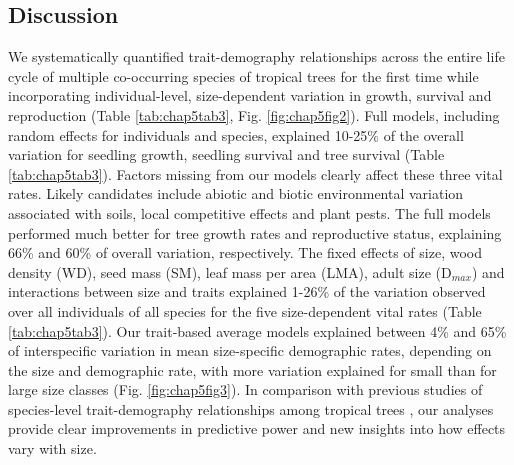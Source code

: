 \documentclass[b5paper,justified]{tufte-book} %
\begin{document}
\begin{fullwidth}
\section{Discussion}
We systematically quantified trait-demography relationships across the entire life cycle of multiple co-occurring
species of tropical trees for the first time while incorporating individual-level, size-dependent variation in growth, survival and reproduction (Table \ref{tab:chap5tab3}, Fig. \ref{fig:chap5fig2}). Full models,
including random effects for individuals and species, explained 10-25\% of the overall variation for seedling
growth, seedling survival and tree survival (Table \ref{tab:chap5tab3}). Factors missing from our models clearly affect these three vital rates. Likely candidates include abiotic and biotic environmental variation associated with soils, local competitive effects and plant pests. The full models performed much better for tree growth rates and reproductive status, explaining 66\% and 60\% of overall variation, respectively. The fixed effects of size, wood density (WD), seed mass (SM), leaf mass per area (LMA), adult size (D$_{max}$) and interactions between size and traits explained 1-26\% of the variation observed over all individuals of all species for the five size-dependent vital rates (Table \ref{tab:chap5tab3}). Our trait-based average models explained between 4\% and 65\% of
interspecific variation in mean size-specific demographic rates, depending on the size and demographic rate, with
more variation explained for small than for large size classes (Fig. \ref{fig:chap5fig3}). In comparison with previous studies of species-level trait-demography relationships among tropical trees \citep{Poorter2008,  Wright2010, Iida2012, Iida2014}, our analyses provide clear improvements in predictive power and new insights into how effects vary with size.


\end{fullwidth}
\end{document}
